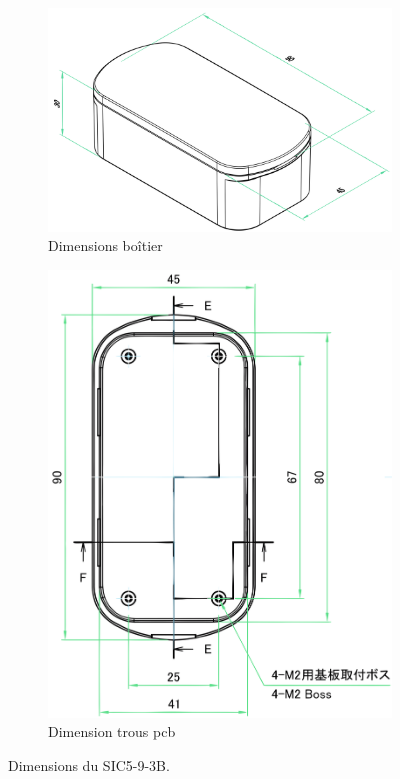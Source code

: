 \begin{figure}[h!]
	\centering
	\begin{subfigure}[b]{0.6\textwidth}
		\centering
		\includegraphics[width=\textwidth]{../figures/dev-pcb/boitier-dim}
		\caption{Dimensions boîtier}
		\label{fig:boitier-dim}
	\end{subfigure}
	\hfill
	\begin{subfigure}[b]{0.35\textwidth}
		\centering
		\includegraphics[width=\textwidth]{../figures/dev-pcb/boitier-dims-pcb}
		\caption{Dimension trous \gls{pcb}}
		\label{fig:boitier-dims-pcb}
	\end{subfigure}
	\caption{Dimensions du SIC5-9-3B.}
	\label{fig:boitier-dimensions}
\end{figure}

